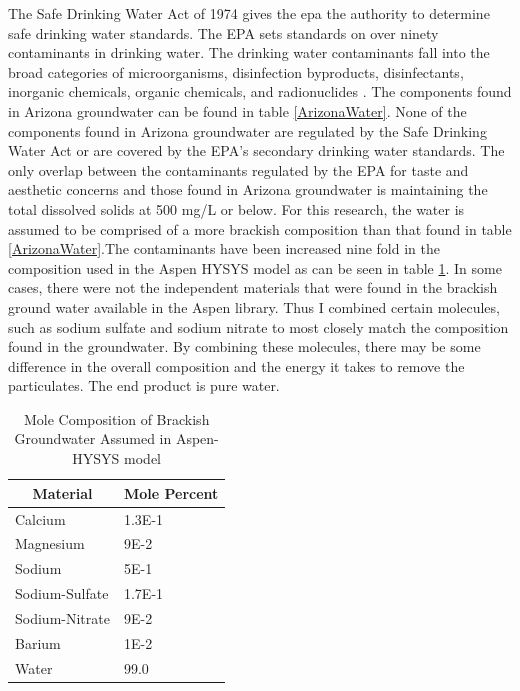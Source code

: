 \documentclass[12pt]{UIdahoMastersThesis}
\begin{document}
The Safe Drinking Water Act of 1974 gives the \ac{epa} the authority to determine safe drinking water standards. The EPA sets standards on over ninety contaminants in drinking water. The drinking water contaminants fall into the broad categories of microorganisms, disinfection byproducts, disinfectants, inorganic chemicals, organic chemicals, and radionuclides \cite{USEPA}. The components found in Arizona groundwater can be found in table \ref{ArizonaWater}.  None of the components found in Arizona groundwater are regulated by the Safe Drinking Water Act or are covered by the EPA's secondary drinking water standards\cite{USEPA}. The only overlap between the contaminants regulated by the EPA for taste and aesthetic concerns and those found in Arizona groundwater is maintaining the total dissolved solids at 500 mg/L or below. For this research, the water is assumed to be comprised of a more brackish composition than that found in table \ref{ArizonaWater}.The contaminants have been increased nine fold in the composition used in the Aspen HYSYS model as can be seen in table \ref{ModelComp}.  In some cases, there were not the independent materials that were found in the brackish ground water available in the Aspen library.  Thus I combined certain molecules, such as sodium sulfate and sodium nitrate to most closely match the composition found in the groundwater.  By combining these molecules, there may be some difference in the overall composition and the energy it takes to remove the particulates.  The end product is pure water.

\begin{table}[h!]
\centering
\caption{Mole Composition of Brackish Groundwater Assumed in Aspen-HYSYS model}
\label{ModelComp}
\begin{tabular}{|l|l|}
\hline
\multicolumn{1}{|c|}{\textbf{Material}}                   & \multicolumn{1}{c|}{\textbf{Mole Percent}} \\ \hline
Calcium & 1.3E-1 \\ \hline
Magnesium  & 9E-2\\ \hline
Sodium  & 5E-1 \\ \hline
Sodium-Sulfate & 1.7E-1 \\ \hline
Sodium-Nitrate & 9E-2 \\ \hline
Barium & 1E-2 \\ \hline
Water & 99.0  \\ \hline
\end{tabular}
\end{table}
\end{document}
